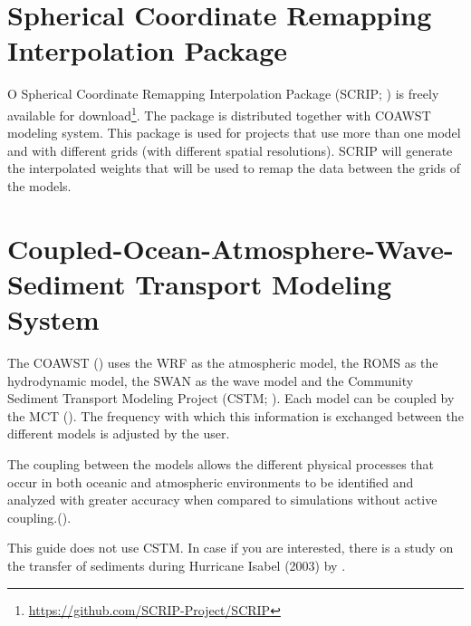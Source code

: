 \section{Spherical Coordinate Remapping Interpolation Package}\label{scripsecao}
\bigskip

\noindent O  Spherical Coordinate Remapping Interpolation Package (SCRIP; \cite{Jones1999,Jones1998}) is freely available for
download\textcolor{bleu_cite}{\textit{}\footnote{\textcolor{bleu_cite}{\href{https://github.com/SCRIP-Project/SCRIP}{https://github.com/SCRIP-Project/SCRIP}}}}. 
The package is distributed together with COAWST modeling system. This package is used for projects that use more than one model and with different grids (with different spatial 
resolutions). SCRIP will generate the interpolated weights that will be used to remap the data between the grids of the models.
\bigskip


\section{Coupled-Ocean-Atmosphere-Wave-Sediment Transport Modeling System}\label{coawstsecao}
\bigskip
\noindent The COAWST (\cite{Warner2010,Warner2008}) uses the WRF as the atmospheric model, the ROMS as the hydrodynamic model, the SWAN as the wave model and the
Community Sediment Transport Modeling Project (CSTM; \cite{Warner2008}). Each model can be coupled by the MCT (\cite{Warner2010, Warner2008}). The frequency with which this information is
exchanged between the different models is adjusted by the user.
\bigskip

\noindent The coupling between the models allows the different physical processes that occur in both oceanic and atmospheric environments to be identified and analyzed with greater accuracy 
when compared to simulations without active coupling.(\cite{Pullen2018, Miller2018}).
\bigskip

\begin{tcolorbox}[enhanced,
  grow to left by   = 0cm,
  grow to right by  = 0cm,
  enlarge top by    = 0cm,
  enlarge bottom by = 0cm,
  tcbox raise base,
  boxrule           = 1.0pt,
  left              = 18mm,
  colframe          = red!50!black,coltext=red!25!black,colback=red!10!white,
  overlay           = {\begin{tcbclipinterior}\fill[red!75!blue!50!white] (frame.south west)
    rectangle node[text=white,font=\sffamily\bfseries\footnotesize,rotate=0] {WARNING} ([xshift=18mm]frame.north west);\end{tcbclipinterior}}]
    This guide does not use CSTM. In case if you are interested, there is a study on the transfer of sediments during Hurricane Isabel (2003) by \textcite{Warner2010}.
\end{tcolorbox}
\bigskip



